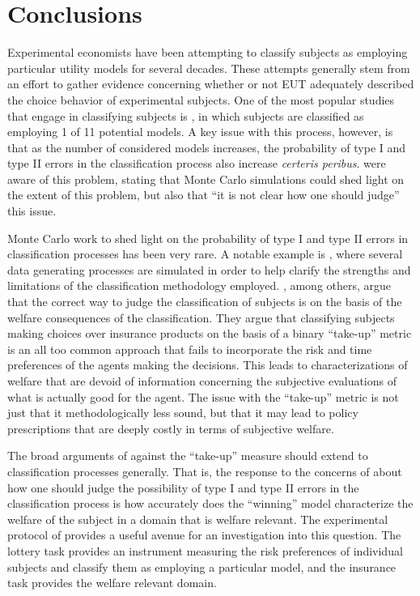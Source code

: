 \documentclass[../main.tex]{subfiles}
\begin{document}
\section{Conclusions}

Experimental economists have been attempting to classify subjects as employing particular utility models for several decades.
These attempts generally stem from an effort to gather evidence concerning whether or not EUT adequately described the choice behavior of experimental subjects.
One of the most popular studies that engage in classifying subjects is \textcite{Hey1994}, in which subjects are classified as employing 1 of 11 potential models.
A key issue with this process, however, is that as the number of considered models increases, the probability of type I and type II errors in the classification process also increase \textit{certeris peribus}.
\textcite[1314-1315]{Hey1994} were aware of this problem, stating that Monte Carlo simulations could shed light on the extent of this problem, but also that \enquote{it is not clear how one should judge} this issue.

Monte Carlo work to shed light on the probability of type I and type II errors in classification processes has been very rare.
A notable example is \textcite{Wilcox2015}, where several data generating processes are simulated in order to help clarify the strengths and limitations of the classification methodology employed.
\textcite{Harrison2016}, among others, argue that the correct way to judge the classification of subjects is on the basis of the welfare consequences of the classification.
They argue that classifying subjects making choices over insurance products on the basis of a binary \enquote{take-up} metric is an all too common approach that fails to incorporate the risk and time preferences of the agents making the decisions.
This leads to characterizations of welfare that are devoid of information concerning the subjective evaluations of what is actually good for the agent.
The issue with the \enquote{take-up} metric is not just that it methodologically less sound, but that it may lead to policy prescriptions that are deeply costly in terms of subjective welfare.

The broad arguments of \textcite{Harrison2016} against the \enquote{take-up} measure should extend to classification processes generally.
That is, the response to the concerns of \textcite{Hey1994} about how one should judge the possibility of type I and type II errors in the classification process is how accurately does the \enquote{winning} model characterize the welfare of the subject in a domain that is welfare relevant.
The experimental protocol of \textcite{Harrison2016} provides a useful avenue for an investigation into this question.
The lottery task provides an instrument measuring the risk preferences of individual subjects and classify them as employing a particular model, and the insurance task provides the welfare relevant domain.
\end{document}
